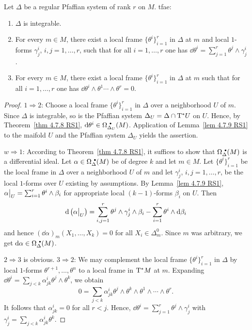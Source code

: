 \begin{prop}\label{prop 4.7.10 RS1}
    Let $\Delta$ be a regular Pfaffian system of rank $r$ on $M$. \gls{tfae}:
    \begin{enumerate}
        \item $\Delta$ is integrable.
        \item For every $m\in M$, there exist a local frame $\{\theta^i\}_{i=1}^r$ in $\Delta$ at $m$ and local $1$-forms $\gamma_j^i$, $i,j=1,\ldots,r$, such that for all $i=1,\ldots,r$ one has $\dd\theta^i=\sum_{j=1}^r \theta^j\wedge \gamma_j^i$.
        \item For every $m\in M$, there exist a local frame $\{\theta^i\}_{i=1}^r$ in $\Delta$ at $m$ such that for all $i=1,\ldots,r$ one has $\dd\theta^i\wedge \theta^1\cdots\wedge\theta^r=0$.
    \end{enumerate}
\end{prop}
\begin{proof}
    $1\Rightarrow2$: Choose a local frame $\{\theta^i\}_{i=1}^r$ in $\Delta$ over a neighborhood $U$ of $m$. Since $\Delta$ is integrable, so is the Pfaffian system $\Delta_U=\Delta\cap \mathrm{T}^\ast U$ on $U$. Hence, by Theorem~\ref{thm 4.7.8 RS1}, $\dd\theta^i\in\Omega^{\smbullet }_{\Delta_U}(M)$. Application of Lemma~\ref{lem 4.7.9 RS1} to the maifold $U$ and the Pfaffian system $\Delta_U$ yields the assertion.

    $w\Rightarrow1$: According to Theorem~\ref{thm 4.7.8 RS1}, it suffices to show that $\Omega^{\smbullet }_\Delta(M)$ is a differential ideal. Let $\alpha\in\Omega^{\smbullet }_\Delta(M)$ be of degree $k$ and let $m\in M$. Let $\{\theta^i\}_{i=1}^r$ be the local frame in $\Delta$ over a neighborhood $U$ of $m$ and let $\gamma^i_j$, $i,j=1,\ldots,r$, be the local $1$-forms over $U$ existing by assumptions. By Lemma~\ref{lem 4.7.9 RS1}, $\restr{\alpha}{U}=\sum_{i=1}^r\theta^i\wedge\beta_i$ for appropriate local $(k-1)$-forms $\beta_i$ on $U$. Then
    \[\dd\left(\restr{\alpha}{U}\right)=\sum_{i,j=1}^r\theta^j\wedge\gamma_j^i\wedge \beta_i-\sum_{i=1}^r \theta^i\wedge\dd \beta_i\]
    and hence $(\dd\alpha)_m(X_1,\ldots,X_k)=0$ for all $X_i\in\Delta_m^0$. Since $m$ was arbitrary, we get $\dd\alpha\in\Omega^{\smbullet }_\Delta(M)$.

    $2\Rightarrow3$ is obvious. $3\Rightarrow2$: We may complement the local frame $\{\theta^i\}_{i=1}^r$ in $\Delta$ by local $1$-forms $\theta^{r+1},\ldots,\theta^n$ to a local frame in $\mathrm{T}^\ast M$ at $m$. Expanding $\dd\theta^i=\sum_{j<k}\alpha^i_{jk}\theta^j\wedge\theta^k$, we obtain
    \[0=\sum_{j<k}\alpha^i_{jk}\theta^j\wedge\theta^k\wedge\theta^1\wedge\cdots\wedge\theta^r.\]
    It follows that $\alpha^i_{jk}=0$ for all $r<j$. Hence, $\dd\theta^i=\sum_{j=1}^r\theta^j\wedge\gamma_j^i$ with $\gamma^i_j=\sum_{j<k}\alpha^i_{jk}\theta^k$.
\end{proof}


